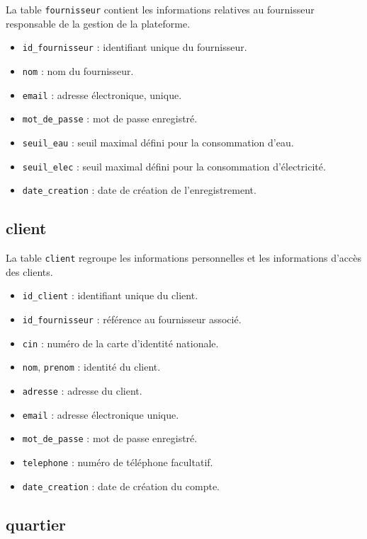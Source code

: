 La table \texttt{fournisseur} contient les informations relatives au fournisseur responsable de la gestion de la plateforme.

\begin{itemize}[leftmargin=*]
    \item \texttt{id\_fournisseur} : identifiant unique du fournisseur.
    \item \texttt{nom} : nom du fournisseur.
    \item \texttt{email} : adresse électronique, unique.
    \item \texttt{mot\_de\_passe} : mot de passe enregistré.
    \item \texttt{seuil\_eau} : seuil maximal défini pour la consommation d'eau.
    \item \texttt{seuil\_elec} : seuil maximal défini pour la consommation d'électricité.
    \item \texttt{date\_creation} : date de création de l'enregistrement.
\end{itemize}

\subsection{client}

La table \texttt{client} regroupe les informations personnelles et les informations d'accès des clients.

\begin{itemize}[leftmargin=*]
    \item \texttt{id\_client} : identifiant unique du client.
    \item \texttt{id\_fournisseur} : référence au fournisseur associé.
    \item \texttt{cin} : numéro de la carte d'identité nationale.
    \item \texttt{nom}, \texttt{prenom} : identité du client.
    \item \texttt{adresse} : adresse du client.
    \item \texttt{email} : adresse électronique unique.
    \item \texttt{mot\_de\_passe} : mot de passe enregistré.
    \item \texttt{telephone} : numéro de téléphone facultatif.
    \item \texttt{date\_creation} : date de création du compte.
\end{itemize}

\subsection{quartier}

